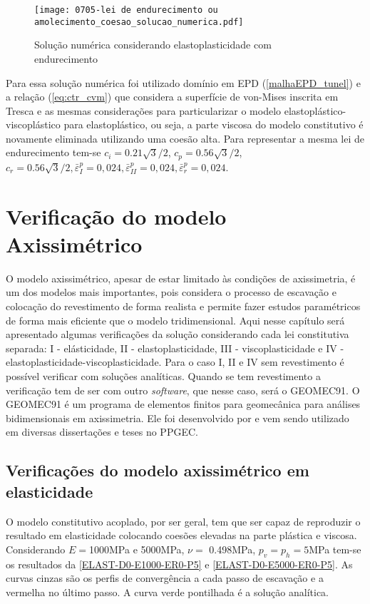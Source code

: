 \begin{figure}[H]
	\begin{center}
		\texttt{[image: 0705-lei de endurecimento ou amolecimento\_coesao\_solucao\_numerica.pdf]}
	\end{center}
	\caption{\label{solucao_numérica_LAJSS}Solução numérica considerando elastoplasticidade com endurecimento}
\end{figure}
Para essa solução numérica foi utilizado domínio em EPD (\autoref{malhaEPD_tunel}) e a relação (\ref{eq:ctr_cvm}) que considera a superfície de von-Mises inscrita em Tresca e as mesmas considerações para particularizar o modelo elastoplástico-viscoplástico para elastoplástico, ou seja, a parte viscosa do modelo constitutivo é novamente eliminada utilizando uma coesão alta. Para representar a mesma lei de endurecimento tem-se $c_i = 0.21\sqrt{3}/2$, $c_p = 0.56\sqrt{3}/2$, $c_r = 0.56\sqrt{3}/2, \bar \varepsilon^p_{I} = 0,024, \bar \varepsilon^p_{II} = 0,024, \bar \varepsilon^p_{r} = 0,024$. 

\section{Verificação do modelo Axissimétrico}
O modelo axissimétrico, apesar de estar limitado às condições de axissimetria, é um dos modelos mais importantes, pois considera o processo de escavação e colocação do revestimento de forma realista e permite fazer estudos paramétricos de forma mais eficiente que o modelo tridimensional. Aqui nesse capítulo será apresentado algumas verificações da solução considerando cada lei constitutiva separada: I - elásticidade, II - elastoplasticidade, III - viscoplasticidade e IV - elastoplasticidade-viscoplasticidade. Para o caso I, II e IV sem revestimento é possível verificar com soluções analíticas. Quando se tem revestimento a verificação tem de ser com outro \textit{software}, que nesse caso, será o GEOMEC91. O GEOMEC91 é um programa de elementos finitos para geomecânica para análises bidimensionais em axissimetria. Ele foi desenvolvido por  e vem sendo utilizado em diversas dissertações e teses no PPGEC.

\subsection{Verificações do modelo axissimétrico em elasticidade}

O modelo constitutivo acoplado, por ser geral, tem que ser capaz de reproduzir o resultado em elasticidade colocando coesões elevadas na parte plástica e viscosa. Considerando $E =$1000MPa e 5000MPa, $\nu =$ 0.498MPa, $p_v = p_h = 5$MPa tem-se os resultados da \autoref{ELAST-D0-E1000-ER0-P5} e \autoref{ELAST-D0-E5000-ER0-P5}. As curvas cinzas são os perfis de convergência a cada passo de escavação e a vermelha no último passo. A curva verde pontilhada é a solução analítica.

